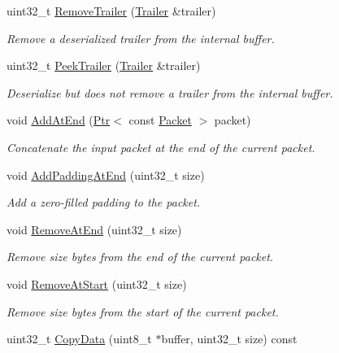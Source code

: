 \begin{DoxyCompactItemize}
uint32\+\_\+t \hyperlink{classns3_1_1Packet_a2155e042083e9a17ad3b33f9fecb4be4}{Remove\+Trailer} (\hyperlink{classns3_1_1Trailer}{Trailer} \&trailer)
\begin{DoxyCompactList}\small\item\em Remove a deserialized trailer from the internal buffer. \end{DoxyCompactList}\item 
uint32\+\_\+t \hyperlink{classns3_1_1Packet_ace1fc287b3fc4fc12e72954e35342131}{Peek\+Trailer} (\hyperlink{classns3_1_1Trailer}{Trailer} \&trailer)
\begin{DoxyCompactList}\small\item\em Deserialize but does {\itshape not} remove a trailer from the internal buffer. \end{DoxyCompactList}\item 
void \hyperlink{classns3_1_1Packet_a14ec3d4250b425468764de58f5837b6b}{Add\+At\+End} (\hyperlink{classns3_1_1Ptr}{Ptr}$<$ const \hyperlink{classns3_1_1Packet}{Packet} $>$ packet)
\begin{DoxyCompactList}\small\item\em Concatenate the input packet at the end of the current packet. \end{DoxyCompactList}\item 
void \hyperlink{classns3_1_1Packet_ae964f1fcfd496c6c0db1b73f27e78530}{Add\+Padding\+At\+End} (uint32\+\_\+t size)
\begin{DoxyCompactList}\small\item\em Add a zero-\/filled padding to the packet. \end{DoxyCompactList}\item 
void \hyperlink{classns3_1_1Packet_a607de6c1abda2a960e99a3b59fd35d14}{Remove\+At\+End} (uint32\+\_\+t size)
\begin{DoxyCompactList}\small\item\em Remove size bytes from the end of the current packet. \end{DoxyCompactList}\item 
void \hyperlink{classns3_1_1Packet_a78aa207e7921dd2f9f7e0d0b7a1c730a}{Remove\+At\+Start} (uint32\+\_\+t size)
\begin{DoxyCompactList}\small\item\em Remove size bytes from the start of the current packet. \end{DoxyCompactList}\item 
uint32\+\_\+t \hyperlink{classns3_1_1Packet_a5a6d304b9e0d90733919ffe224b98f0d}{Copy\+Data} (uint8\+\_\+t $\ast$buffer, uint32\+\_\+t size) const 

\end{DoxyCompactItemize}
